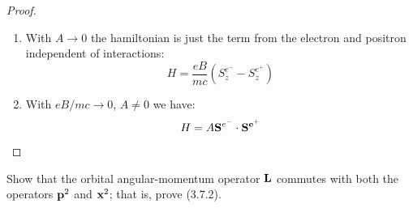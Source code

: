 \begin{proof}

    \begin{enumerate}
        \item With $A \to 0$ the hamiltonian is just the term from the
            electron and positron independent of interactions:
            \[
                H = \frac{e B}{mc} \left(S^{e^-}_{z} - S^{e^+}_{z}
                \right)
            \]

        \item With $eB/mc \to 0$, $A \not= 0$ we have:
            \[
                H = A \mathbf{S}^{e^-} \cdot \mathbf{S^{e^+}}
            \]
    \end{enumerate}

\end{proof}


\begin{exer}[3.16]

    Show that the orbital angular-momentum operator $\mathbf{L}$ commutes
    with both the operators $\mathbf{p}^2$ and $\mathbf{x}^2$; that is, prove
    (3.7.2).

\end{exer}

